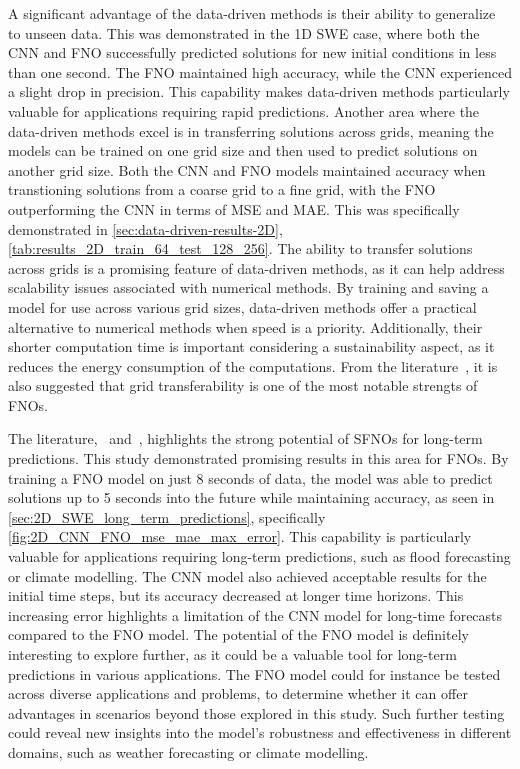 A significant advantage of the data-driven methods is their ability to generalize to unseen data.
This was demonstrated in the 1D SWE case, where both the CNN and FNO successfully predicted solutions for new initial conditions in less than one second.
The FNO maintained high accuracy, while the CNN experienced a slight drop in precision.
This capability makes data-driven methods particularly valuable for applications requiring rapid predictions.
Another area where the data-driven methods excel is in transferring solutions across grids, meaning the models can be trained on one grid size and then used to predict solutions on another grid size.
Both the CNN and FNO models maintained accuracy when transtioning solutions from a coarse grid to a fine grid, with the FNO outperforming the CNN in terms of MSE and MAE.
This was specifically demonstrated in \autoref{sec:data-driven-results-2D}, \autoref{tab:results_2D_train_64_test_128_256}.
The ability to transfer solutions across grids is a promising feature of data-driven methods, as it can help address scalability issues associated with numerical methods.
By training and saving a model for use across various grid sizes, data-driven methods offer a practical alternative to numerical methods when speed is a priority.
Additionally, their shorter computation time is important considering a sustainability aspect, as it reduces the energy consumption of the computations.
From the literature~\cite{FNO_2021}, it is also suggested that grid transferability is one of the most notable strengts of FNOs.

The literature,~\cite{Nvidia2023} and~\cite{bonev2023-SFNO}, highlights the strong potential of SFNOs for long-term predictions.
This study demonstrated promising results in this area for FNOs.
By training a FNO model on just 8 seconds of data, the model was able to predict solutions up to 5 seconds into the future while maintaining accuracy, as seen in \autoref{sec:2D_SWE_long_term_predictions}, specifically \autoref{fig:2D_CNN_FNO_mse_mae_max_error}.
This capability is particularly valuable for applications requiring long-term predictions, such as flood forecasting or climate modelling.
The CNN model also achieved acceptable results for the initial time steps, but its accuracy decreased at longer time horizons.
This increasing error highlights a limitation of the CNN model for long-time forecasts compared to the FNO model.
The potential of the FNO model is definitely interesting to explore further, as it could be a valuable tool for long-term predictions in various applications.
The FNO model could for instance be tested across diverse applications and problems, to determine whether it can offer advantages in scenarios beyond those explored in this study.
Such further testing could reveal new insights into the model's robustness and effectiveness in different domains, such as weather forecasting or climate modelling.

